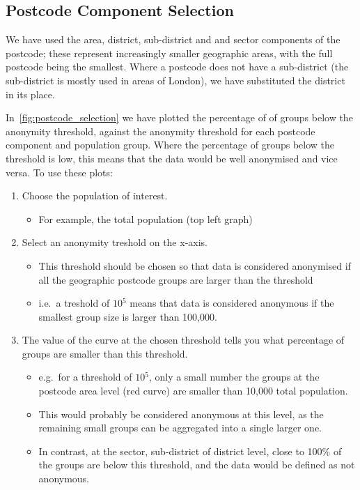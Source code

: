 \documentclass[12pt, a4paper]{article}
\begin{document}
\subsection{Postcode Component Selection}

We have used the area, district, sub-district and and sector components of the postcode; these represent increasingly smaller geographic areas, with the full postcode being the smallest. Where a postcode does not have a sub-district (the sub-district is mostly used in areas of London), we have substituted the district in its place.

In~\cref{fig:postcode_selection} we have plotted the percentage of of groups below the anonymity threshold, against the anonymity threshold for each postcode component and population group. Where the percentage of groups below the threshold is low, this means that the data would be well anonymised and vice versa. To use these plots:
\begin{enumerate}
\item Choose the population of interest.
\begin{itemize}
\item For example, the total population (top left graph)
\end{itemize}
\item Select an anonymity treshold on the x-axis. 
\begin{itemize}
\item This threshold should be chosen so that data is considered anonymised if all the geographic postcode groups are larger than the threshold
\item i.e.\ a treshold of $10{^5}$ means that data is considered anonymous if the smallest group size is larger than 100,000.
\end{itemize}
\item The value of the curve at the chosen threshold tells you what percentage of groups are smaller than this threshold.
\begin{itemize}
\item e.g.\ for a threshold of $10{^5}$, only a small number the groups at the postcode area level (red curve) are smaller than 10,000 total population.
\item This would probably be considered anonymous at this level, as the remaining small groups can be aggregated into a single larger one.
\item In contrast, at the sector, sub-district of district level, close to 100\% of the groups are below this threshold, and the data would be defined as not anonymous.
\end{itemize}
\end{enumerate}
\end{document}
